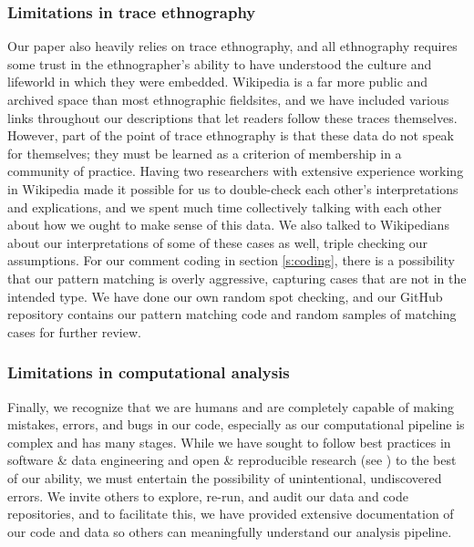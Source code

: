 \documentclass[format=acmsmall, review=false, screen=true]{acmart}%
\begin{document}
\subsubsection{Limitations in trace ethnography}
Our paper also heavily relies on trace ethnography, and all ethnography requires some trust in the ethnographer's ability to have understood the culture and lifeworld in which they were embedded. Wikipedia is a far more public and archived space than most ethnographic fieldsites, and we have included various links throughout our descriptions that let readers follow these traces themselves. However, part of the point of trace ethnography is that these data do not speak for themselves; they must be learned as a criterion of membership in a community of practice. Having two researchers with extensive experience working in Wikipedia made it possible for us to double-check each other's interpretations and explications, and we spent much time collectively talking with each other about how we ought to make sense of this data. We also talked to Wikipedians about our interpretations of some of these cases as well, triple checking our assumptions. For our comment coding in section \ref{s:coding}, there is a possibility that our pattern matching is overly aggressive, capturing cases that are not in the intended type. We have done our own random spot checking, and our GitHub repository contains our pattern matching code and random samples of matching cases for further review. 

\subsubsection{Limitations in computational analysis}
Finally, we recognize that we are humans and are completely capable of making mistakes, errors, and bugs in our code, especially as our computational pipeline is complex and has many stages. While we have sought to follow best practices in software \& data engineering and open \& reproducible research (see \citep{repro}) to the best of our ability, we must entertain the possibility of unintentional, undiscovered errors. We invite others to explore, re-run, and audit our data and code repositories, and to facilitate this, we have provided extensive documentation of our code and data so others can meaningfully understand our analysis pipeline.
\end{document}
